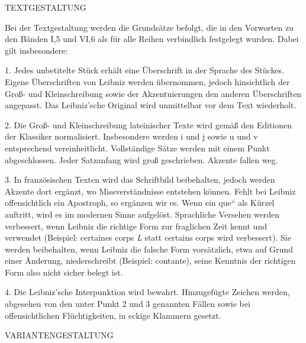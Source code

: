 \thispagestyle{empty}
{\vrule height 0mm depth 30mm width 0mm}
\par\noindent 
\uppercase{Textgestaltung}\par\vspace{1.0ex}
\noindent Bei der Textgestaltung werden die Grunds\"{a}tze befolgt, die in den Vorworten zu den B\"{a}nden I,5 und VI,6 als f\"{u}r alle Reihen verbindlich festgelegt wurden. Dabei gilt insbesondere:\par
1. Jedes unbetitelte St\"{u}ck erh\"{a}lt eine \"{U}berschrift in der Sprache des St\"{u}ckes. Eigene \"{U}berschriften von Leibniz werden \"{u}bernommen, jedoch hinsichtlich der Gro{\ss}- und Kleinschreibung sowie der Akzentuierungen den anderen \"{U}berschriften angepasst. Das Leibniz'sche Original wird unmittelbar vor dem Text wiederholt.\par
2. Die Gro{\ss}- und Kleinschreibung lateinischer Texte wird gem\"{a}{\ss} den Editionen der Klassiker normalisiert. Insbesondere werden i und j sowie u und v entsprechend vereinheitlicht. Vollst\"{a}ndige S\"{a}tze werden mit einem Punkt abgeschlossen. Jeder Satzanfang wird gro{\ss} geschrieben. Akzente fallen weg.\par
3. In franz\"{o}sischen Texten wird das Schriftbild beibehalten, jedoch werden Akzente dort erg\"{a}nzt, wo Missverst\"{a}ndnisse entstehen k\"{o}nnen. Fehlt bei Leibniz offensichtlich ein Apostroph, so erg\"{a}nzen wir es. Wenn ein \glqq que`` als K\"{u}rzel auftritt, wird es im modernen Sinne aufgel\"{o}st. Sprachliche Versehen werden verbessert, wenn Leibniz die richtige Form zur fraglichen Zeit kennt und verwendet (Beispiel: certaines corps \textit{L} statt certains corps wird verbessert). Sie werden beibehalten, wenn Leibniz die falsche Form vors\"{a}tzlich, etwa auf Grund einer \"{A}nderung, niederschreibt (Beispiel: contante), seine Kenntnis der richtigen Form also nicht sicher belegt ist.\par
4. Die Leibniz'sche Interpunktion wird bewahrt. Hinzugef\"{u}gte Zeichen werden, abgesehen von den unter Punkt 2 und 3 genannten F\"{a}llen sowie bei offensichtlichen Fl\"{u}chtigkeiten, in eckige Klammern gesetzt.\par
\par\vspace{5.0ex}
\noindent\uppercase{Variantengestaltung}\par\vspace{1.0ex}
\noindent
